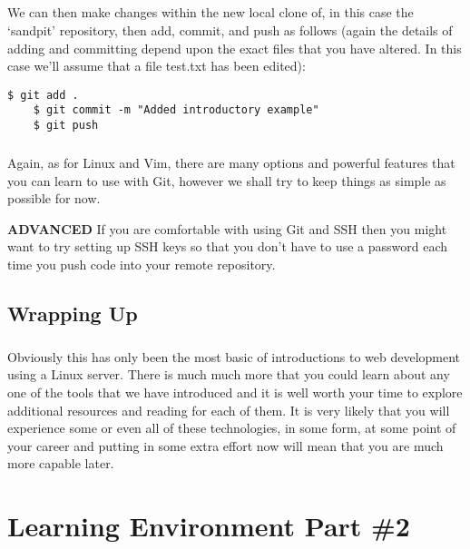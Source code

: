 \documentclass[12pt, a4paper, twoside]{book}
\begin{document}
\paragraph{} We can then make changes within the new local clone of, in this case the `sandpit' repository, then add, commit, and push as follows (again the details of adding and committing depend upon the exact files that you have altered. In this case we'll assume that a file test.txt has been edited):

\begin{lstlisting}[style=DOS]
    $ git add .
    $ git commit -m "Added introductory example"
    $ git push
\end{lstlisting}

\paragraph{} Again, as for Linux and Vim, there are many options and powerful features that you can learn to use with Git, however we shall try to keep things as simple as possible for now.

\begin{framed}
\textbf{ADVANCED} If you are comfortable with using Git and SSH then you might want to try setting up SSH keys so that you don't have to use a password each time you push code into your remote repository.
\end{framed}

\section{Wrapping Up}
\label{chapter_01_wrap-up}
\paragraph{} Obviously this has only been the most basic of introductions to web development using a Linux server. There is much much more that you could learn about any one of the tools that we have introduced and it is well worth your time to explore additional resources and reading for each of them. It is very likely that you will experience some or even all of these technologies, in some form, at some point of your career and putting in some extra effort now will mean that you are much more capable later.


\chapter{Learning Environment Part \#2}
\label{lab2}
\end{document}
